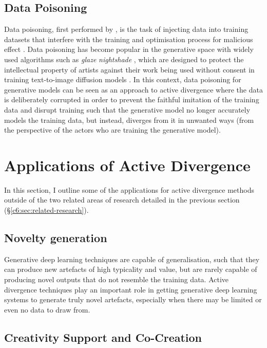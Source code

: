 \subsection{Data Poisoning}

Data poisoning, first performed by \cite{biggio2012poisoning}, is the task of injecting data into training datasets that interfere with the training and optimisation process for malicious effect \citep{fan2022survey}. 
Data poisoning has become popular in the generative space with widely used algorithms such as \textit{glaze} \citep{shan2023glaze} \textit{nightshade} \citep{shan2024nightshade}, which are designed to protect the intellectual property of artists against their work being used without consent in training text-to-image diffusion models \citep{rombach2022high}. 
In this context, data poisoning for generative models can be seen as an approach to active divergence where the data is deliberately corrupted in order to prevent the faithful imitation of the training data and disrupt training such that the generative model no longer accurately models the training data, but instead, diverges from it in unwanted ways (from the perspective of the actors who are training the generative model). 

\section{Applications of Active Divergence}

In this section, I outline some of the applications for active divergence methods outside of the two related areas of research detailed in the previous section (\S \ref{c6:sec:related-research}).

\subsection{Novelty generation}

Generative deep learning techniques are capable of generalisation, such that they can produce new artefacts of high typicality and value, but are rarely capable of producing novel outputs that do not resemble the training data. 
Active divergence techniques play an important role in getting generative deep learning systems to generate truly novel artefacts, especially when there may be limited or even no data to draw from. 

\subsection{Creativity Support and Co-Creation}

